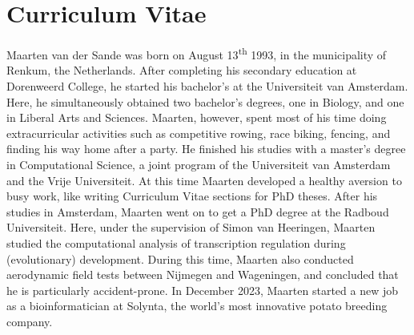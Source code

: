 \section{Curriculum Vitae}

Maarten van der Sande was born on August 13\textsuperscript{th} 1993, in the municipality of Renkum, the Netherlands. After completing his secondary education at Dorenweerd College, he started his bachelor's at the Universiteit van Amsterdam. Here, he simultaneously obtained two bachelor's degrees, one in Biology, and one in Liberal Arts and Sciences. Maarten, however, spent most of his time doing extracurricular activities such as competitive rowing, race biking, fencing, and finding his way home after a party. He finished his studies with a master's degree in Computational Science, a joint program of the Universiteit van Amsterdam and the Vrije Universiteit. At this time Maarten developed a healthy aversion to busy work, like writing Curriculum Vitae sections for PhD theses. After his studies in Amsterdam, Maarten went on to get a PhD degree at the Radboud Universiteit. Here, under the supervision of Simon van Heeringen, Maarten studied the computational analysis of transcription regulation during (evolutionary) development. During this time, Maarten also conducted aerodynamic field tests between Nijmegen and Wageningen, and concluded that he is particularly accident-prone. In December 2023, Maarten started a new job as a bioinformatician at Solynta, the world's most innovative potato breeding company.
